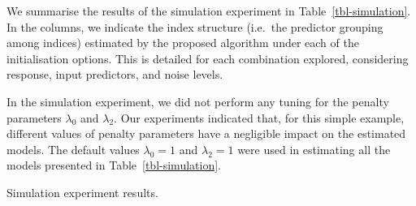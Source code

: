 \documentclass[
  11pt,
  a4paper,
]{article}
\begin{document}
We summarise the results of the simulation experiment in
Table~\ref{tbl-simulation}. In the columns, we indicate the index
structure (i.e.~the predictor grouping among indices) estimated by the
proposed algorithm under each of the initialisation options. This is
detailed for each combination explored, considering response, input
predictors, and noise levels.

In the simulation experiment, we did not perform any tuning for the
penalty parameters \(\lambda_{0}\) and \(\lambda_{2}\). Our experiments
indicated that, for this simple example, different values of penalty
parameters have a negligible impact on the estimated models. The default
values \(\lambda_{0} = 1\) and \(\lambda_{2} = 1\) were used in
estimating all the models presented in Table~\ref{tbl-simulation}.

\begin{table}[!h]

\caption{\label{tbl-simulation}Simulation experiment results.}

\centering{

}
\end{table}
\end{document}
